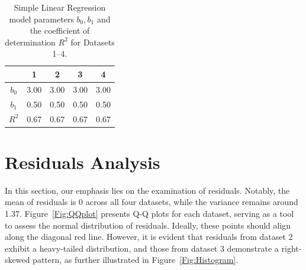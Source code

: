 \documentclass[12pt]{article}
\begin{document}
	\begin{table}[htpb]
		\centering
		\begin{tabular}{|c|c|c|c|c|}
			\hline
			 & 1 & 2 & 3 & 4  \\
			\hline
			$b_0$ & 3.00 & 3.00 & 3.00 & 3.00  \\
			\hline
			$b_1$ & 0.50 & 0.50 & 0.50 & 0.50  \\
			\hline
			$R^2$ & 0.67 & 0.67 & 0.67 & 0.67  \\
			\hline

		\end{tabular}
		\caption{Simple Linear Regression model parameters $b_0, b_1$ and the coefficient of determination $R^2$ for Datasets 1--4.}
		\label{tab:1}
	\end{table}



	
	\section{Residuals Analysis}
	
		
In this section, our emphasis lies on the examination of residuals. Notably, the mean of residuals is 0 across all four datasets, while the variance remains around 1.37. Figure~\ref{Fig:QQplot} presents Q-Q plots for each dataset, serving as a tool to assess the normal distribution of residuals. Ideally, these points should align along the diagonal red line. However, it is evident that residuals from dataset 2 exhibit a heavy-tailed distribution, and those from dataset 3 demonstrate a right-skewed pattern, as further illustrated in Figure~\ref{Fig:Histogram}.
\end{document}
